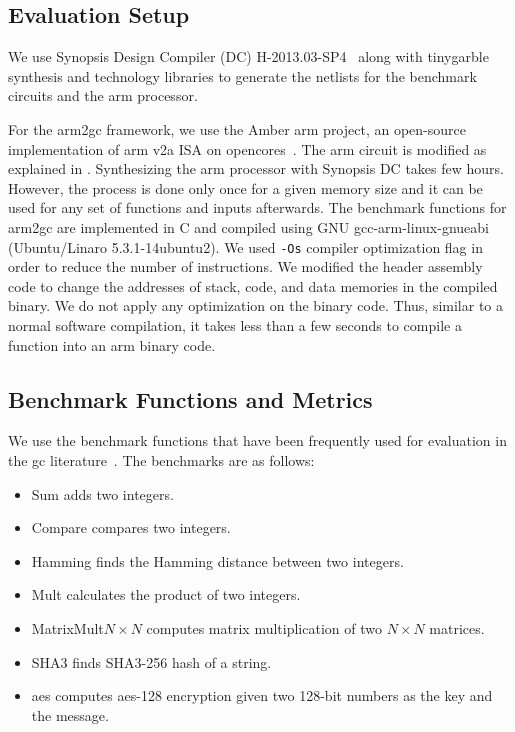 \subsection{Evaluation Setup}
We use Synopsis Design Compiler (DC) H-2013.03-SP4~\cite{tool:DesignCompiler} along with \gls{tinygarble}~\cite{songhori2015tinygarble} synthesis and technology libraries to generate the netlists for the benchmark circuits and the \gls{arm} processor.

For the \gls{arm2gc} framework, we use the Amber \gls{arm} project, an open-source implementation of \gls{arm} v2a ISA on opencores~\cite{santifort2010amber}.
The \gls{arm} circuit is modified as explained in .
Synthesizing the \gls{arm} processor with Synopsis DC takes few hours.
However, the process is done only once for a given memory size and it can be used for any set of functions and inputs afterwards.
The benchmark functions for \gls{arm2gc} are implemented in C and compiled using GNU gcc-arm-linux-gnueabi (Ubuntu/Linaro 5.3.1-14ubuntu2).
We used \texttt{-Os} compiler optimization flag in order to reduce the number of instructions.
We modified the header assembly code to change the addresses of stack, code, and data memories in the compiled binary.
We do not apply any optimization on the binary code.
Thus, similar to a normal software compilation, it takes less than a few seconds to compile a function into an \gls{arm} binary code.

\subsection{Benchmark Functions and Metrics}
We use the benchmark functions that have been frequently used for evaluation in the \acrshort{gc} literature~\cite{holzer2012secure, songhori2015tinygarble, wang2016secure}. The benchmarks are as follows:

\begin{itemize}
\vspace{-0.06in}
\item Sum adds two integers.
\vspace{-0.1in}
\item Compare compares two integers.
\vspace{-0.1in}
\item Hamming finds the Hamming distance between two integers.
\vspace{-0.1in}
\item Mult calculates the product of two integers.
\vspace{-0.1in}
\item MatrixMult$N\times N$ computes matrix multiplication of two $N\times N$ matrices.
\vspace{-0.1in}
\item SHA3 finds SHA3-256 hash of a string.
\vspace{-0.1in}
\item \acrshort{aes} computes \acrshort{aes}-128 encryption given two 128-bit numbers as the key and the message.
\end{itemize}

